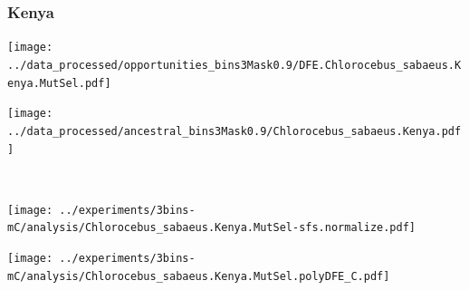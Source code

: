 \subsubsection{Kenya}

\begin{minipage}{0.49\linewidth}
    \texttt{[image: ../data\_processed/opportunities\_bins3Mask0.9/DFE.Chlorocebus\_sabaeus.Kenya.MutSel.pdf]}
\end{minipage}
\begin{minipage}{0.49\linewidth}
    \texttt{[image: ../data\_processed/ancestral\_bins3Mask0.9/Chlorocebus\_sabaeus.Kenya.pdf]}
\end{minipage}
\\
\begin{minipage}{0.49\linewidth}
    \texttt{[image: ../experiments/3bins-mC/analysis/Chlorocebus\_sabaeus.Kenya.MutSel-sfs.normalize.pdf]}
\end{minipage}
\begin{minipage}{0.4\linewidth}
    \texttt{[image: ../experiments/3bins-mC/analysis/Chlorocebus\_sabaeus.Kenya.MutSel.polyDFE\_C.pdf]}
\end{minipage}
